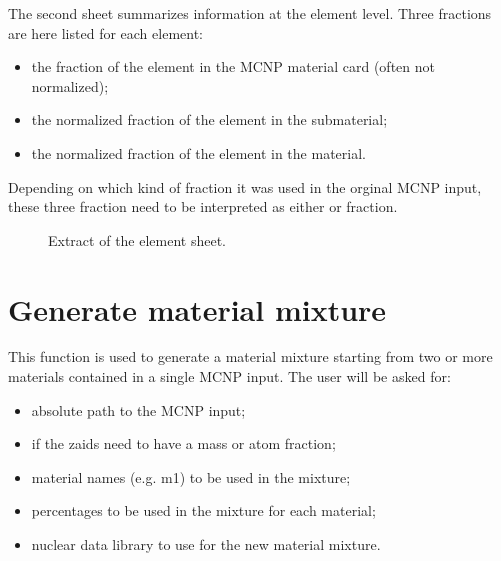 \documentclass[letterpaper,10pt,english]{sphinxmanual}
\let\sphinxpxdimen\pdfpxdimen\else\newdimen\sphinxpxdimen
\begin{document}
\sphinxAtStartPar
The second sheet summarizes information at the element level.
Three fractions are here listed for each element:
\begin{itemize}
\item {} 
\sphinxAtStartPar
the fraction of the element in the MCNP material card (often not normalized);

\item {} 
\sphinxAtStartPar
the normalized fraction of the element in the submaterial;

\item {} 
\sphinxAtStartPar
the normalized fraction of the element in the material.

\end{itemize}

\sphinxAtStartPar
Depending on which kind of fraction it was used in the orginal MCNP input,
these three fraction need to be interpreted as either  or  fraction.

\begin{figure}[htbp]
\centering
\capstart

\noindent\sphinxincludegraphics[width=600\sphinxpxdimen]{{printmat2}.jpg}
\caption{Extract of the element sheet.}\label{\detokenize{usage/utilities:id4}}\end{figure}


\section{Generate material mixture}
\label{\detokenize{usage/utilities:generate-material-mixture}}
\sphinxAtStartPar
{}

\sphinxAtStartPar
This function is used to generate a material mixture starting from two or
more materials contained in a single MCNP input. The user will be asked for:
\begin{itemize}
\item {} 
\sphinxAtStartPar
absolute path to the MCNP input;

\item {} 
\sphinxAtStartPar
if the zaids need to have a mass or atom fraction;

\item {} 
\sphinxAtStartPar
material names (e.g. m1) to be used in the mixture;

\item {} 
\sphinxAtStartPar
percentages to be used in the mixture for each material;

\item {} 
\sphinxAtStartPar
nuclear data library to use for the new material mixture.

\end{itemize}
\end{document}
